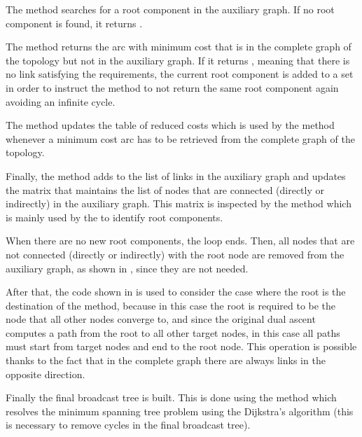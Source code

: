 The  method searches for a root component in the auxiliary
graph. If no root component is found, it returns .

The  method returns the arc with minimum cost that is in the
complete graph of the topology but not in the auxiliary graph. If it returns
, meaning that there is no link satisfying the requirements, the
current root component is added to a set in order to instruct the
 method to not return the same root component again avoiding
an infinite cycle.

The  method updates the table of reduced costs which is used by
the  method whenever a minimum cost arc has to be retrieved
from the complete graph of the topology.

Finally, the  method adds  to the list of links in
the auxiliary graph and updates the  matrix that maintains the
list of nodes that are connected (directly or indirectly) in the auxiliary
graph. This matrix is inspected by the  method which is
mainly used by the  to identify root components.

When there are no new root components, the loop ends. Then, all nodes that are
not connected (directly or indirectly) with the root node are removed from the
auxiliary graph, as shown in , since they are
not needed.



After that, the code shown in  is used to
consider the case where the root is the destination of the method, because in
this case the root is required to be the node that all other nodes converge to,
and since the original dual ascent computes a path from the root to all other
target nodes, in this case all paths must start from target nodes and end to the
root node. This operation is possible thanks to the fact that in the complete
graph there are always links in the opposite direction.



Finally the final broadcast tree is built. This is done using the method
 which resolves the minimum spanning tree problem using
the Dijkstra's algorithm (this is necessary to remove cycles in the final
broadcast tree).
